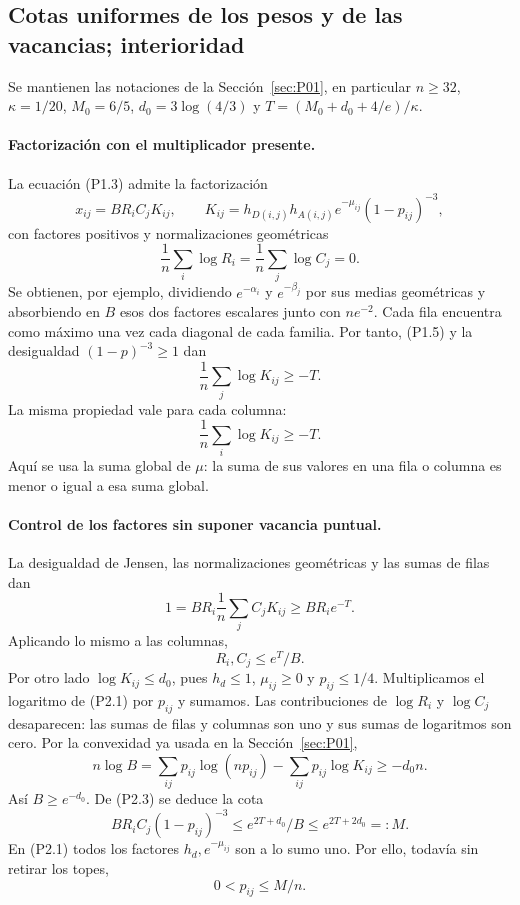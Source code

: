 \subsection{Cotas uniformes de los pesos y de las vacancias; interioridad}\label{sec:P02}
Se mantienen las notaciones de la Sección~\ref{sec:P01}, en particular
$n\ge32$, $\kappa=1/20$, $M_0=6/5$, $d_0=3\log(4/3)$ y
$T=(M_0+d_0+4/e)/\kappa$.

\paragraph{Factorización con el multiplicador presente.}
La ecuación (P1.3) admite la factorización
\[
 x_{ij}=B R_i C_j K_{ij},\qquad
 K_{ij}=h_{D(i,j)}h_{A(i,j)}e^{-\mu_{ij}}(1-p_{ij})^{-3},
                                                               \tag{P2.1}
\]
con factores positivos y normalizaciones geométricas
\[
 \frac1n\sum_i\log R_i=\frac1n\sum_j\log C_j=0.
\]
Se obtienen, por ejemplo, dividiendo $e^{-\alpha_i}$ y
$e^{-\beta_j}$ por sus medias geométricas y absorbiendo en $B$
esos dos factores escalares junto con $ne^{-2}$.
Cada fila encuentra como máximo una vez cada diagonal de cada
familia. Por tanto, (P1.5) y la desigualdad $(1-p)^{-3}\ge1$ dan
\[
 \frac1n\sum_j\log K_{ij}\ge-T.
\]
La misma propiedad vale para cada columna:
\[
 \frac1n\sum_i\log K_{ij}\ge-T.                  \tag{P2.2}
\]
Aquí se usa la suma global de $\mu$: la suma de sus valores en una
fila o columna es menor o igual a esa suma global.

\paragraph{Control de los factores sin suponer vacancia puntual.}
La desigualdad de Jensen, las normalizaciones geométricas y las sumas de filas dan
\[
 1=B R_i\frac1n\sum_j C_jK_{ij}\ge B R_i e^{-T}.
\]
Aplicando lo mismo a las columnas,
\[
 R_i,C_j\le e^T/B.                               \tag{P2.3}
\]
Por otro lado $\log K_{ij}\le d_0$, pues $h_d\le1$,
$\mu_{ij}\ge0$ y $p_{ij}\le1/4$.
Multiplicamos el logaritmo de (P2.1) por $p_{ij}$ y sumamos.
Las contribuciones de $\log R_i$ y $\log C_j$ desaparecen: las
sumas de filas y columnas son uno y sus sumas de logaritmos son
cero. Por la convexidad ya usada en la Sección~\ref{sec:P01},
\[
 n\log B=\sum_{ij}p_{ij}\log(np_{ij})
               -\sum_{ij}p_{ij}\log K_{ij}\ge-d_0n.
\]
Así $B\ge e^{-d_0}$. De (P2.3) se deduce la cota
\[
 B R_i C_j(1-p_{ij})^{-3}
 \le e^{2T+d_0}/B\le e^{2T+2d_0}=:M.             \tag{P2.4}
\]
En (P2.1) todos los factores $h_d,e^{-\mu_{ij}}$ son a lo sumo
uno. Por ello, todavía sin retirar los topes,
\[
             0<p_{ij}\le M/n.                    \tag{P2.5}
\]

